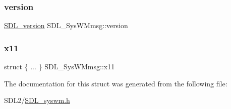 \subsubsection{\texorpdfstring{version}{version}}
{\footnotesize\ttfamily \hyperlink{struct_s_d_l__version}{S\+D\+L\+\_\+version} S\+D\+L\+\_\+\+Sys\+W\+Mmsg\+::version}

\mbox{\label{struct_s_d_l___sys_w_mmsg_ac60fef6de87deff6fe9cf4f49f9ff96c}} 
\subsubsection{\texorpdfstring{x11}{x11}}
{\footnotesize\ttfamily struct \{ ... \}   S\+D\+L\+\_\+\+Sys\+W\+Mmsg\+::x11}



The documentation for this struct was generated from the following file\+:\begin{DoxyCompactItemize}
\item 
S\+D\+L2/\hyperlink{_s_d_l__syswm_8h}{S\+D\+L\+\_\+syswm.\+h}\end{DoxyCompactItemize}
